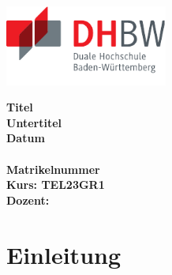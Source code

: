 \documentclass{article}
\begin{document}
\begin{titlepage}
  \begin{center}
  \includegraphics[width=0.4\textwidth]{_res/dhbw_de.pdf}
  \end{center}

  	\enlargethispage{25mm}
	\begin{center}
		\vspace*{20mm}	{\LARGE\textbf{Titel}}\\
		\vspace*{12mm}	{\Large \textbf{Untertitel}}\\
		\vspace*{12mm}	\textbf{Datum}\\
		\vspace*{5mm}	\textbf{}\\
        \vspace*{75mm}	\textbf{Matrikelnummer}\\
        \vspace*{5mm}   \textbf{Kurs: TEL23GR1}\\
        \vspace*{5mm}   \textbf{Dozent:
        }
	\end{center}
\end{titlepage}

\graphicspath{{./_res/}}
            
\thispagestyle{empty} %

\tableofcontents

\newpage 
{}


\section{Einleitung}
\end{document}
